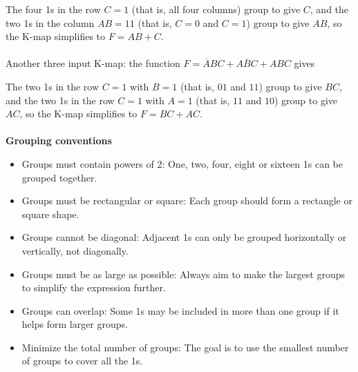 \documentclass[a4paper,12pt]{article}
\begin{document}
The four 1s in the row $C=1$ (that is, all four columns) group to give $C$, and the two 1s in the column $AB=11$ (that is, $C=0$ and $C=1$) group to give $AB$, so the K-map simplifies to $F=AB+C$.\\\\
Another three input K-map: the function $F=\overline{A}BC+A\overline{B}C+ABC$ gives
\begin{center}
\end{center}
The two 1s in the row $C=1$ with $B=1$ (that is, $01$ and $11$) group to give $BC$, and the two 1s in the row $C=1$ with $A=1$ (that is, $11$ and $10$) group to give $AC$, so the K-map simplifies to $F=BC+AC$.\\\\
\textbf{Grouping conventions}
\begin{itemize}
    \item Groups must contain powers of 2: One, two, four, eight or sixteen 1s can be 
grouped together.
	\item Groups must be rectangular or square: Each group should form a rectangle or 
square shape. 
\item Groups cannot be diagonal: Adjacent 1s can only be grouped horizontally or vertically, 
not diagonally. 
\item Groups must be as large as possible: Always aim to make the largest groups to simplify the expression further. 
\item Groups can overlap: Some 1s may be included in more than one group if it helps form 
larger groups. 
\item Minimize the total number of groups: The goal is to use the smallest number of groups to cover all the 1s. 
    \end{itemize}
\end{document}
